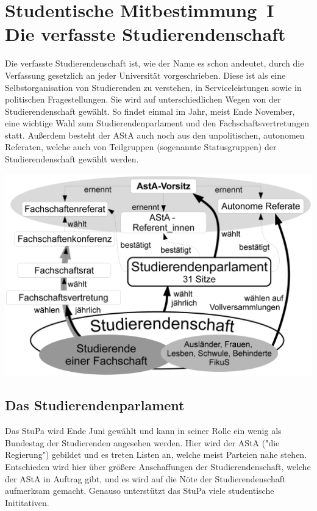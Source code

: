\section[Studentische Mitbestimmung]{Studentische Mitbestimmung~I\\Die verfasste Studierendenschaft}
\label{studmit}
\begin{multicols*}{2}
Die verfasste Studierendenschaft ist, wie der Name es schon andeutet, durch die Verfassung gesetzlich an jeder Universität vorgeschrieben.
Diese ist als eine Selbstorganisation von Studierenden zu verstehen, in Serviceleistungen sowie in politischen Fragestellungen.
Sie wird auf unterschiedlichen Wegen von der Studierendenschaft gewählt.
So findet einmal im Jahr, meist Ende November, eine wichtige Wahl zum Studierendenparlament und den Fachschaftsvertretungen statt.
Außerdem besteht der AStA auch noch aus den unpolitischen, autonomen Referaten, welche auch von Teilgruppen (sogenannte Statusgruppen) der Studierendenschaft gewählt werden.

\bigskip
\includegraphics[width=\columnwidth]{res/verfasste_studierendenschaft.png}
\bigskip

\subsection{Das Studierendenparlament}
Das StuPa wird Ende Juni gewählt und kann in seiner Rolle ein wenig als Bundestag der Studierenden angesehen werden.
Hier wird der AStA ("die Regierung") gebildet und es treten Listen an, welche meist Parteien nahe stehen.
Entschieden wird hier über größere Anschaffungen der Studierendenschaft, welche der AStA in Auftrag gibt, und es wird auf die Nöte der Studierendenschaft aufmerksam gemacht.
Genauso unterstützt das StuPa viele studentische Inititativen.


\end{multicols*}
